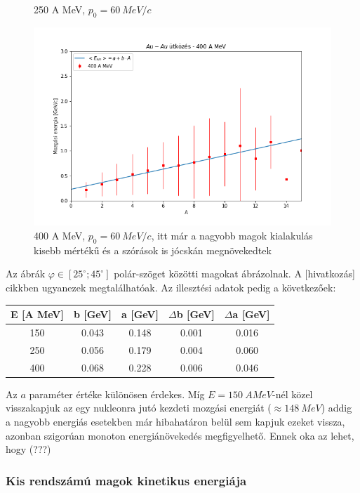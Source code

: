 \documentclass[a4paper,12pt]{article}
\begin{document}
\begin{figure}[!htb]
\begin{minipage}{.49\textwidth}
    \caption{250 A MeV, $p_{0} = 60 ~MeV/c$}
\end{minipage}
\begin{minipage}[c]{.8\textwidth}
\centering
    \includegraphics[width=\textwidth]{./400AMeV006mom2000adat.png}
    \caption{400 A MeV, $p_{0} = 60 ~MeV/c$, itt már a nagyobb magok kialakulás kisebb mértékű és a szórások is jócskán megnövekedtek}
\end{minipage}
\end{figure}

\par Az ábrák $\varphi \in [25^{\circ}; 45^{\circ}]$ polár-szöget közötti magokat ábrázolnak. A [hivatkozás] cikkben ugyanezek megtalálhatóak. Az illesztési adatok pedig a következőek:

\vspace{5mm}

\begin{center}
\begin{tabular}{|c|c|c|c|c|}
\hline
E [A MeV] & b [GeV] & a [GeV] & $\Delta$b [GeV] & $\Delta$a [GeV] \\
\hline
150 & 0.043 & 0.148 & 0.001 & 0.016 \\
\hline
250 & 0.056 & 0.179 & 0.004 & 0.060 \\
\hline
400 & 0.068 & 0.228 & 0.006 & 0.046 \\
\hline
\end{tabular}
\end{center}

\vspace{5mm}

\par Az $a$ paraméter értéke különösen érdekes. Míg $E = 150 ~A MeV$-nél közel visszakapjuk az egy nukleonra jutó kezdeti mozgási energiát ($\approx 148 ~MeV$) addig a nagyobb energiás esetekben már hibahatáron belül sem kapjuk ezeket vissza, azonban szigorúan monoton energiánövekedés megfigyelhető. Ennek oka az lehet, hogy (???)

\vspace{5mm}

\subsubsection{ Kis rendszámú magok kinetikus energiája}

\vspace{5mm}
\end{document}
